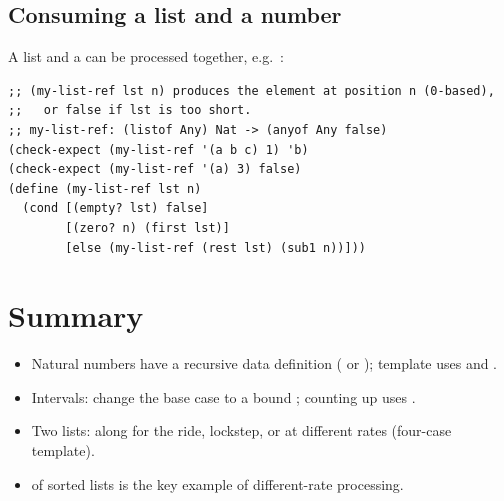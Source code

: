 \subsection{Consuming a list and a number}
A list and a  can be processed together, e.g.\ :
\begin{lstlisting}[style=racket]
;; (my-list-ref lst n) produces the element at position n (0-based),
;;   or false if lst is too short.
;; my-list-ref: (listof Any) Nat -> (anyof Any false)
(check-expect (my-list-ref '(a b c) 1) 'b)
(check-expect (my-list-ref '(a) 3) false)
(define (my-list-ref lst n)
  (cond [(empty? lst) false]
        [(zero? n) (first lst)]
        [else (my-list-ref (rest lst) (sub1 n))]))
\end{lstlisting}

\section{Summary}
\begin{itemize}
  \item Natural numbers have a recursive data definition ( or ); template uses  and .
  \item Intervals: change the base case to a bound ; counting up uses .
  \item Two lists: along for the ride, lockstep, or at different rates (four-case template).
  \item {} of sorted lists is the key example of different-rate processing.
\end{itemize}
